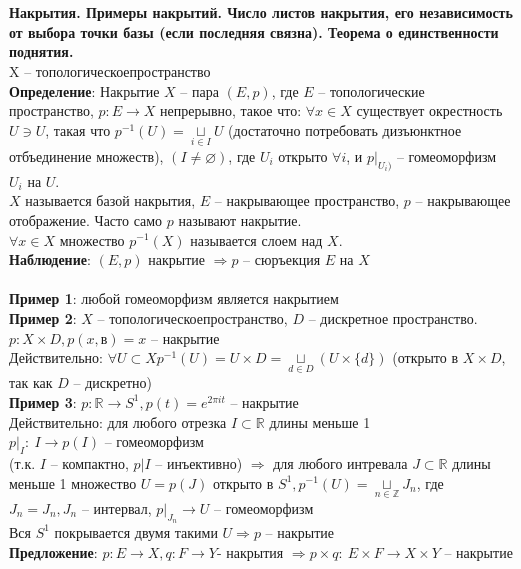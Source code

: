 \section{} 
	\textbf{Накрытия. Примеры накрытий. Число листов накрытия, его независимость от выбора точки базы (если последняя связна). Теорема о единственности поднятия.}\\
	X -- топологическоепространство
	\\
	\textbf{Определение}: Накрытие $X$ -- пара $(E, p)$, где $E$ -- топологические пространство, $p: E \rightarrow X$ непрерывно, такое что: $\forall x\in X$ существует окрестность $U \ni U$, такая что $p^{-1} (U) = \underset{i\in I}{\sqcup} U$ (достаточно потребовать дизъюнктное отбъединение множеств), $(I \neq \varnothing)$, где $U_i$ открыто $\forall i$, и ${p|}_{U_i)}$ -- гомеоморфизм $U_i$ на $U$.\\
	$X$ называется базой накрытия, $E$ -- накрывающее пространство, $p$ -- накрывающее отображение. Часто само $p$ называют накрытие.\\
	$\forall x\in X$ множество $p^{-1} (X)$ называется слоем над $X$.\\
	\textbf{Наблюдение}: $(E,p)$ накрытие $\Rightarrow p$ -- сюръекция $E$ на $X$\\
	\\
	\textbf{Пример 1}: любой гомеоморфизм является накрытием\\
	\textbf{Пример 2}: $X$ -- топологическоепространство, $D$ -- дискретное пространство. $p: X\times D, p(x, в) = x$ -- накрытие\\
	Действительно: $\forall U \subset X p^{-1} (U) = U\times D = \underset{d\in D}{\sqcup} (U \times \{ d\})$ (открыто в $X\times D$, так как $D$ -- дискретно)\\
	\textbf{Пример 3}: $p: \mathbb{R} \rightarrow S^1, p(t) = e^{2\pi it}$ -- накрытие\\
	Действительно: для любого отрезка $I\subset \mathbb{R}$ длины меньше 1\\
	${p|}_I:\ I \rightarrow p(I)$ -- гомеоморфизм\\
	(т.к. $I$ -- компактно, $p|{I}$ -- инъективно) $\Rightarrow$ для любого интревала $J \subset \mathbb{R}$ длины меньше 1 множество $U = p(J)$ открыто в $S^1, p^{-1} (U) = \underset{n\in \mathbb{Z}}{\sqcup} J_n$, где $J_n = J_n, J_n$ -- интервал, ${p|}_{J_n} \rightarrow U$ -- гомеоморфизм\\
	Вся $S^1$ покрывается двумя такими $U \Rightarrow p$ -- накрытие\\
	\textbf{Предложение}: $p: E\rightarrow X, q: F\rightarrow Y$- накрытия $\Rightarrow p\times q:\ E\times F \rightarrow X\times Y$ -- накрытие\\
